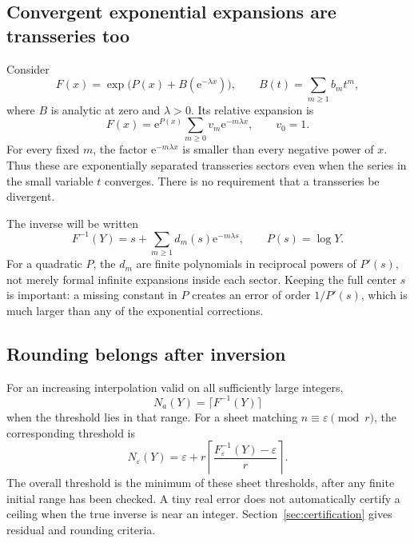 \documentclass[11pt]{article}
\numberwithin{equation}{section}
\theoremstyle{definition}
\newcommand{\ee}{\mathrm e}
\newcommand{\eps}{\varepsilon}
\begin{document}
\subsection{Convergent exponential expansions are transseries too}

Consider
\begin{equation}\label{eq:basic-shape}
 F(x)=\exp\bigl(P(x)+B(\ee^{-\lambda x})\bigr),\qquad
 B(t)=\sum_{m\ge1}b_m t^m,
\end{equation}
where $B$ is analytic at zero and $\lambda>0$. Its relative expansion is
\[
 F(x)=\ee^{P(x)}\sum_{m\ge0}v_m\ee^{-m\lambda x},\qquad v_0=1.
\]
For every fixed $m$, the factor $\ee^{-m\lambda x}$ is smaller than every negative power of $x$. Thus these are exponentially separated transseries sectors even when the series in the small variable $t$ converges. There is no requirement that a transseries be divergent.

The inverse will be written
\begin{equation}\label{eq:inverse-shape-intro}
 F^{-1}(Y)=s+\sum_{m\ge1}d_m(s)\ee^{-m\lambda s},\qquad
 P(s)=\log Y.
\end{equation}
For a quadratic $P$, the $d_m$ are finite polynomials in reciprocal powers of $P'(s)$, not merely formal infinite expansions inside each sector. Keeping the full center $s$ is important: a missing constant in $P$ creates an error of order $1/P'(s)$, which is much larger than any of the exponential corrections.

\subsection{Rounding belongs after inversion}

For an increasing interpolation valid on all sufficiently large integers,
\begin{equation}\label{eq:rounding}
 N_a(Y)=\lceil F^{-1}(Y)\rceil
\end{equation}
when the threshold lies in that range. For a sheet matching $n\equiv\eps\pmod r$, the corresponding threshold is
\begin{equation}\label{eq:residue-rounding}
 N_{\eps}(Y)=\eps+r\left\lceil\frac{F_{\eps}^{-1}(Y)-\eps}{r}\right\rceil.
\end{equation}
The overall threshold is the minimum of these sheet thresholds, after any finite initial range has been checked. A tiny real error does not automatically certify a ceiling when the true inverse is near an integer. Section~\ref{sec:certification} gives residual and rounding criteria.
\end{document}
